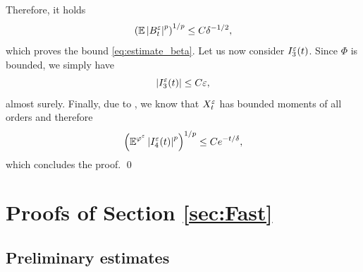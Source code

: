 \documentclass[10pt]{article}
\begin{document}
\begin{appendices}
	Therefore, it holds
	\begin{equation}
		\left(\operatorname{\mathbb{E}}\left\lvert B_t^\varepsilon\right\rvert^p\right)^{1/p}\leq C \delta^{-1/2},
	\end{equation}
	which proves the bound \eqref{eq:estimate_beta}. Let us now consider $I_3^\varepsilon(t)$. Since $\Phi$ is bounded, we simply have
	\begin{equation}
	\left\lvert I_3^\varepsilon(t)\right\rvert \leq C \varepsilon, 
	\end{equation}
	almost surely. Finally, due to \cite[Corollary 5.4]{PaS07}, we know that $X_t^\varepsilon$ has bounded moments of all orders and therefore
	\begin{equation}
	\left(\operatorname{\mathbb{E}}^{\varphi^\varepsilon} \left\lvert I_4^\varepsilon(t)\right\rvert^p\right)^{1/p} \leq C e^{-t/\delta},
	\end{equation}
	which concludes the proof. \qed

\section{Proofs of Section \ref{sec:Fast}} \label{ap:ProofsDeltaZeta}

\subsection{Preliminary estimates}


\end{appendices}
\end{document}
